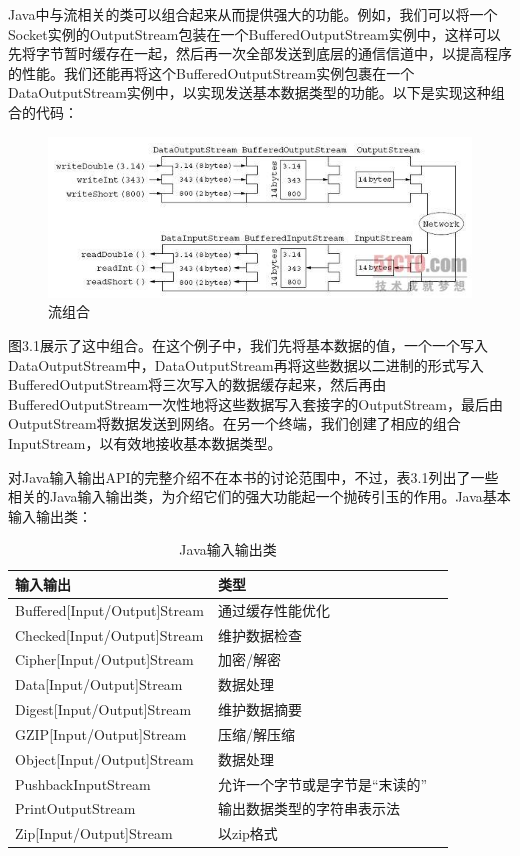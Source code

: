 	Java中与流相关的类可以组合起来从而提供强大的功能。例如，我们可以将一个Socket实例的OutputStream包装在一个BufferedOutputStream实例中，这样可以先将字节暂时缓存在一起，然后再一次全部发送到底层的通信信道中，以提高程序的性能。我们还能再将这个BufferedOutputStream实例包裹在一个DataOutputStream实例中，以实现发送基本数据类型的功能。以下是实现这种组合的代码： 

	

	\clearpage

	\begin{figure}[htbp]%
		\centering
		\includegraphics[scale=.8]{img/03.01.jpg}
		\caption{流组合}
		\label{fig:comp.stream}
	\end{figure}

	图3.1展示了这中组合。在这个例子中，我们先将基本数据的值，一个一个写入DataOutputStream中，DataOutputStream再将这些数据以二进制的形式写入BufferedOutputStream将三次写入的数据缓存起来，然后再由BufferedOutputStream一次性地将这些数据写入套接字的OutputStream，最后由OutputStream将数据发送到网络。在另一个终端，我们创建了相应的组合InputStream，以有效地接收基本数据类型。 

	对Java输入输出API的完整介绍不在本书的讨论范围中，不过，表3.1列出了一些相关的Java输入输出类，为介绍它们的强大功能起一个抛砖引玉的作用。Java基本输入输出类：

		\begin{table}[htbp]
			\caption{Java输入输出类}
			\label{tab:java.io.class}
			\centering
			\begin{tabular}{lll}
				\hline
					输入输出                     & 类型 \\
				\hline
					Buffered[Input/Output]Stream & 通过缓存性能优化  \\
					Checked[Input/Output]Stream  & 维护数据检查  \\
					Cipher[Input/Output]Stream   & 加密/解密   \\
					Data[Input/Output]Stream     & 数据处理   \\
					Digest[Input/Output]Stream   & 维护数据摘要   \\
					GZIP[Input/Output]Stream     & 压缩/解压缩   \\
					Object[Input/Output]Stream   & 数据处理   \\
					PushbackInputStream          & 允许一个字节或是字节是“末读的”  \\
					PrintOutputStream            & 输出数据类型的字符串表示法  \\
					Zip[Input/Output]Stream      & 以zip格式  \\
				\hline
			\end{tabular}
		\end{table}

